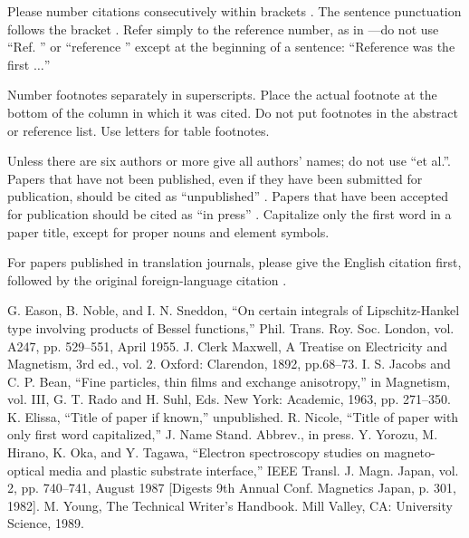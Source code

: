 \documentclass[conference]{IEEEtran}
\begin{document}
Please number citations consecutively within brackets \cite{b1}. The 
sentence punctuation follows the bracket \cite{b2}. Refer simply to the reference 
number, as in \cite{b3}---do not use ``Ref. \cite{b3}'' or ``reference \cite{b3}'' except at 
the beginning of a sentence: ``Reference \cite{b3} was the first $\ldots$''

Number footnotes separately in superscripts. Place the actual footnote at 
the bottom of the column in which it was cited. Do not put footnotes in the 
abstract or reference list. Use letters for table footnotes.

Unless there are six authors or more give all authors' names; do not use 
``et al.''. Papers that have not been published, even if they have been 
submitted for publication, should be cited as ``unpublished'' \cite{b4}. Papers 
that have been accepted for publication should be cited as ``in press'' \cite{b5}. 
Capitalize only the first word in a paper title, except for proper nouns and 
element symbols.

For papers published in translation journals, please give the English 
citation first, followed by the original foreign-language citation \cite{b6}.

\begin{thebibliography}{00}
 G. Eason, B. Noble, and I. N. Sneddon, ``On certain integrals of Lipschitz-Hankel type involving products of Bessel functions,'' Phil. Trans. Roy. Soc. London, vol. A247, pp. 529--551, April 1955.
 J. Clerk Maxwell, A Treatise on Electricity and Magnetism, 3rd ed., vol. 2. Oxford: Clarendon, 1892, pp.68--73.
 I. S. Jacobs and C. P. Bean, ``Fine particles, thin films and exchange anisotropy,'' in Magnetism, vol. III, G. T. Rado and H. Suhl, Eds. New York: Academic, 1963, pp. 271--350.
 K. Elissa, ``Title of paper if known,'' unpublished.
 R. Nicole, ``Title of paper with only first word capitalized,'' J. Name Stand. Abbrev., in press.
 Y. Yorozu, M. Hirano, K. Oka, and Y. Tagawa, ``Electron spectroscopy studies on magneto-optical media and plastic substrate interface,'' IEEE Transl. J. Magn. Japan, vol. 2, pp. 740--741, August 1987 [Digests 9th Annual Conf. Magnetics Japan, p. 301, 1982].
 M. Young, The Technical Writer's Handbook. Mill Valley, CA: University Science, 1989.
\end{thebibliography}
\end{document}
